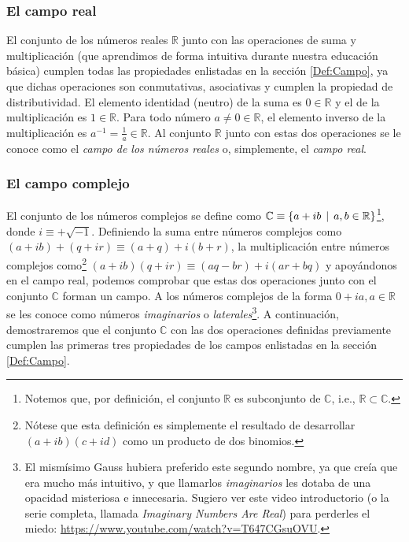 \documentclass[12pt]{article}
\begin{document}
\subsubsection{El campo real}

El conjunto de los números reales $\mathbb{R}$ junto con las operaciones de suma y multiplicación (que aprendimos de forma intuitiva durante nuestra educación básica) cumplen todas las propiedades enlistadas en la sección \ref{Def:Campo}, ya que dichas operaciones son conmutativas, asociativas y cumplen la propiedad de distributividad. El elemento identidad (neutro) de la suma es $0\in\mathbb{R}$ y el de la multiplicación es $1\in\mathbb{R}$. Para todo número $a\neq0\in\mathbb{R}$, el elemento inverso de la multiplicación es $a^{-1} = \frac{1}{a}\in\mathbb{R}$. Al conjunto $\mathbb{R}$ junto con estas dos operaciones se le conoce como el \emph{campo de los números reales} o, simplemente, el \emph{campo real}.

\subsubsection{El campo complejo} \label{Ejem:Campo_complejo}

El conjunto de los números complejos se define como $\mathbb{C} \equiv \{a+ib\hspace{1.5mm}|\hspace{1.5mm}a,b\in\mathbb{R}\}$\footnote{Notemos que, por definición, el conjunto $\mathbb{R}$ es subconjunto de $\mathbb{C}$, i.e., $\mathbb{R}\subset\mathbb{C}$.}, donde $i\equiv+\sqrt{-1}$. Definiendo la suma entre números complejos como $(a+ib)+(q+ir)\equiv(a+q) + i(b+r)$, la multiplicación entre números complejos como\footnote{Nótese que esta definición es simplemente el resultado de desarrollar $(a+ib)(c+id)$ como un producto de dos binomios.} $(a+ib)(q+ir)\equiv (aq-br) + i(ar+bq)$ y apoyándonos en el campo real, podemos comprobar que estas dos operaciones junto con el conjunto $\mathbb{C}$ forman un campo. A los números complejos de la forma $0+ia, a\in\mathbb{R}$ se les conoce como números \emph{imaginarios} o \emph{laterales}\footnote{El mismísimo Gauss hubiera preferido este segundo nombre, ya que creía que era mucho más intuitivo, y que llamarlos \emph{imaginarios} les dotaba de una opacidad misteriosa e innecesaria. Sugiero ver este video introductorio (o la serie completa, llamada \emph{Imaginary Numbers Are Real}) para perderles el miedo: \url{https://www.youtube.com/watch?v=T647CGsuOVU}.}. A continuación, demostraremos que el conjunto $\mathbb{C}$ con las dos operaciones definidas previamente cumplen las primeras tres propiedades de los campos enlistadas en la sección \ref{Def:Campo}.
\end{document}
